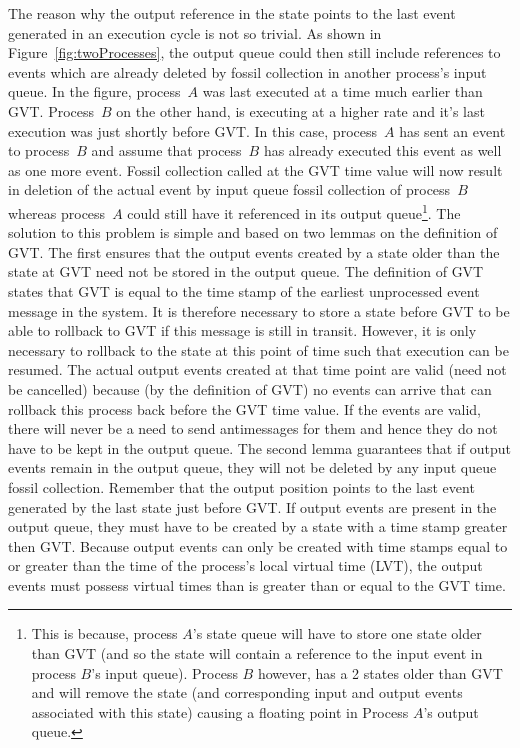 \documentclass[11pt]{report}
\begin{document}
The reason why the output reference in the state points to the last event
generated in an execution cycle is not so trivial. As shown in
Figure~\ref{fig:twoProcesses}, the output queue could then still include
references to events which are already deleted by fossil collection in
another process's input queue. In the figure, process~$A$ was last
executed at a time much earlier than GVT. Process~$B$ on the other hand,
is executing at a higher rate and it's last execution was just shortly
before GVT. In this case, process~$A$ has sent an event to process~$B$ and
assume that process~$B$ has already executed this event as well as one
more event. Fossil collection called at the GVT time value will now result
in deletion of the actual event by input queue fossil collection of
process~$B$ whereas process~$A$ could still have it referenced in its
output queue\footnote{This is because, process $A$'s state queue will have
to store one state older than GVT (and so the state will contain a
reference to the input event in process $B$'s input queue). Process $B$
however, has a 2 states older than GVT and will remove the state (and
corresponding input and output events associated with this state) causing
a floating point in Process $A$'s output queue.}. The solution to this
problem is simple and based on two lemmas on the definition of GVT. The
first ensures that the output events created by a state older than the
state at GVT need not be stored in the output queue. The definition of GVT
states that GVT is equal to the time stamp of the earliest unprocessed
event message in the system. It is therefore necessary to store a state
before GVT to be able to rollback to GVT if this message is still in
transit.  However, it is only necessary to rollback to the state at this
point of time such that execution can be resumed. The actual output events
created at that time point are valid (need not be cancelled) because (by
the definition of GVT) no events can arrive that can rollback this process
back before the GVT time value.  If the events are valid, there will never
be a need to send antimessages for them and hence they do not have to be
kept in the output queue.  The second lemma guarantees that if output
events remain in the output queue, they will not be deleted by any input
queue fossil collection. Remember that the output position points to the
last event generated by the last state just before GVT. If output events
are present in the output queue, they must have to be created by a state
with a time stamp greater then GVT. Because output events can only be
created with time stamps equal to or greater than the time of the
process's local virtual time (LVT), the output events must possess virtual
times than is greater than or equal to the GVT time.
\end{document}
